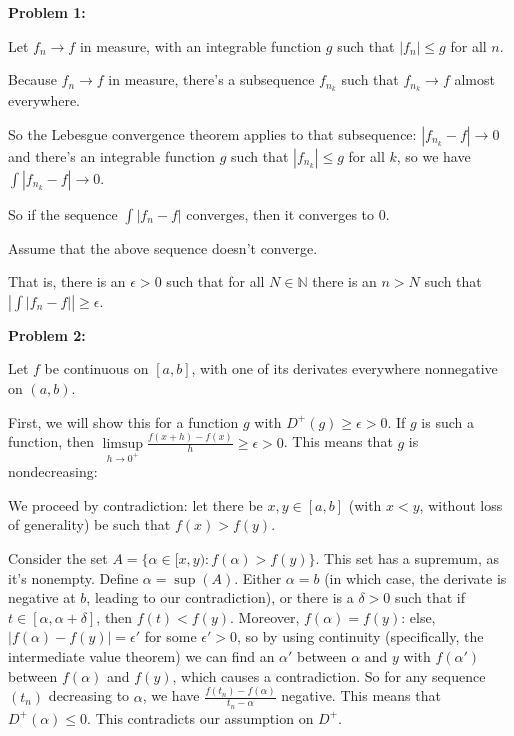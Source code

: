 \documentclass[a4paper,12pt]{article}
\newcommand{\tab}{\hspace{4mm}} %
\newcommand{\shunt}{\vspace{20mm}}
\newcommand{\absval}[1]{\left\lvert #1 \right\rvert}
\newcommand{\al}{\alpha} %
\newcommand{\de}{\delta}
\newcommand{\ep}{\epsilon}
\newcommand{\N}{\mathbb{N}}
\begin{document}
{\bf Problem 1:} 

Let $f_n \to f$ in measure, with an integrable function $g$ such that $\absval{f_n} \leq g$ for all $n$.

Because $f_n \to f$ in measure, there's a subsequence $f_{n_k}$ such that $f_{n_k} \to f$ almost everywhere.

So the Lebesgue convergence theorem applies to that subsequence: $\absval{f_{n_k} - f} \to 0$ and there's an integrable function $g$ such that $\absval{f_{n_k}} \leq g$ for all $k$, so we have $\int \absval{f_{n_k} - f} \to 0$.

So if the sequence $\int \absval{f_n - f}$ converges, then it converges to $0$.

Assume that the above sequence doesn't converge.

\tab That is, there is an $\ep>0$ such that for all $N \in \N$ there is an $n > N$ such that $\absval{\int \absval{f_n-f}} \geq \ep$.

\tab %

\shunt

{\bf Problem 2:}

Let $f$ be continuous on $[a,b]$, with one of its derivates everywhere nonnegative on $(a,b)$.

First, we will show this for a function $g$ with $D^+(g) \geq \ep >0$. If $g$ is such a function, then $\limsup\limits_{h \to 0^+} \frac{f(x+h)-f(x)}{h} \geq \ep> 0$. This means that $g$ is nondecreasing:

\tab We proceed by contradiction: let there be $x,y \in [a,b]$ (with $x<y$, without loss of generality) be such that $f(x) > f(y)$.

\tab Consider the set $A = \{\al \in [x,y): f(\al) > f(y)\}$. This set has a supremum, as it's nonempty. Define $\al =\sup(A)$. Either $\al = b$ (in which case, the derivate is negative at $b$, leading to our contradiction), or there is a $\de>0$ such that if $t \in [\al, \al+\de]$, then $f(t) < f(y)$. Moreover, $f(\al) = f(y)$: else, $\absval{f(\al) - f(y)} = \ep'$ for some $\ep' >0$, so by using continuity (specifically, the intermediate value theorem) we can find an $\al'$ between $\al$ and $y$ with $f(\al')$ between $f(\al)$ and $f(y)$, which causes a contradiction. So for any sequence $(t_n)$ decreasing to $\al$, we have $\frac{f(t_n) - f(\al)}{t_n - \al}$ negative. This means that $D^+(\al) \leq 0$. This contradicts our assumption on $D^+$.
\end{document}
